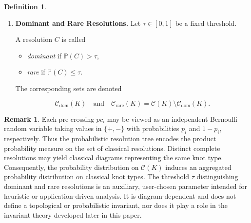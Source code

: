 \documentclass[a4paper, reqno, 12pt]{amsart}
\theoremstyle{plain}
\theoremstyle{definition}
\newtheorem{definition}[theorem]{Definition}
\newtheorem{remark}[theorem]{Remark}
\begin{document}
\begin{definition}
\begin{enumerate}
where $P(C)$ (resp.~$N(C)$) denotes the set of pre-crossings resolved positively (resp.~negatively) in $C$.

This assignment defines a probability distribution on the set
\[
\mathcal{C}(K)
:=
\{ \text{all complete classical resolutions of } K \},
\]
since
\[
\sum_{C \in \mathcal{C}(K)} \mathbb{P}(C) = 1 .
\]

\smallbreak

\item \textbf{Dominant and Rare Resolutions.}
Let $\tau \in [0,1]$ be a fixed threshold.

A resolution $C$ is called

\begin{itemize}
\item \emph{dominant} if $\mathbb{P}(C)>\tau$,

\item \emph{rare} if $\mathbb{P}(C)\leq \tau$.
\end{itemize}

The corresponding sets are denoted

\[
\mathcal{C}_{\mathrm{dom}}(K)
\quad \text{and} \quad
\mathcal{C}_{\mathrm{rare}}(K)
=
\mathcal{C}(K)\setminus
\mathcal{C}_{\mathrm{dom}}(K).
\]

\end{enumerate}
\end{definition}


\begin{remark}\rm
Each pre-crossing $pc_i$ may be viewed as an independent Bernoulli random variable taking values in $\{+,-\}$ with probabilities $p_i$ and $1-p_i$, respectively. Thus the probabilistic resolution tree encodes the product probability measure on the set of classical resolutions. Distinct complete resolutions may yield classical diagrams representing the same knot type. Consequently, the probability distribution on $\mathcal{C}(K)$ induces an aggregated probability distribution on classical knot types. The threshold $\tau$ distinguishing dominant and rare resolutions is an auxiliary, user-chosen parameter intended for heuristic or application-driven analysis. It is diagram-dependent and does not define a topological or probabilistic invariant, nor does it play a role in the invariant theory developed later in this paper.
\end{remark}
\end{document}
